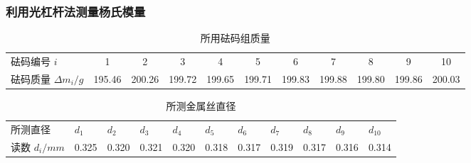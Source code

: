 \documentclass{ctexart}
\begin{document}
  \subsubsection{利用光杠杆法测量杨氏模量}
\begin{table}[H]
  \centering
  \caption{所用砝码组质量}
  \resizebox{\textwidth}{!}
  {
    \begin{tabular}{lcccccccccc}
    砝码编号 $i$& 1     & 2     & 3     & 4     & 5     & 6     & 7     & 8     & 9&10 \\
    砝码质量 $\Delta m_i /g$ & 195.46 & 200.26 & 199.72 & 199.65 & 199.71 & 199.83 & 199.88 & 199.80 & 199.86 & 200.03 \\
    \end{tabular}%
  }
  \label{tab:addlabel}%
\end{table}%
\begin{table}[H]
  \centering
  \caption{所测金属丝直径}
   
      \resizebox{\textwidth}{!}
      {
        \begin{tabular}{lrrrrrrrrrr}
    所测直径 & \multicolumn{1}{l}{$d_1$} & \multicolumn{1}{l}{$d_2$} & \multicolumn{1}{l}{$d_3$} & \multicolumn{1}{l}{$d_4$} & \multicolumn{1}{l}{$d_5$} & \multicolumn{1}{l}{$d_6$} & \multicolumn{1}{l}{$d_7$} & \multicolumn{1}{l}{$d_8$} & \multicolumn{1}{l}{$d_9$} & \multicolumn{1}{l}{$d_{10}$} \\
    读数  $d_i/mm$  & 0.325 & 0.320  & 0.321 & 0.320  & 0.318 & 0.317 & 0.319 & 0.317 & 0.316 & 0.314 \\
    \end{tabular}%
      }
  \label{tab:addlabel}%
\end{table}%
\end{document}
